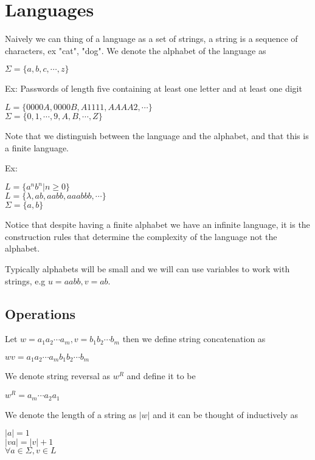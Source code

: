 \documentclass[11pt]{exam}
\begin{document}
\newpage 

\tableofcontents

\newpage
\section{Languages}

Naively we can thing of a language as a set of strings, a string is a sequence of characters, ex "cat", "dog".
We denote the alphabet of the language as
\begin{center}
$\Sigma = \{a,b,c, \cdots, z\}$
\end{center} 

Ex: Passwords of length five containing at least one letter and at least one digit

\begin{center}
$L = \{0000A, 0000B, A1111, AAAA2, \cdots \}$\\
$\Sigma = \{0,1, \cdots, 9, A , B , \cdots , Z \}$ 
\end{center} 

Note that we distinguish between the language and the alphabet, and that this is a finite language.

Ex: 
\begin{center}
$L = \{a^nb^n | n \geq 0 \}$\\
$L = \{ \lambda, ab, aabb, aaabbb, \cdots \}$\\
$\Sigma = \{a,b\}$\\ 
\end{center}

Notice that despite having a finite alphabet we have an infinite language, it is the construction rules that determine the complexity of the language not the alphabet.

Typically alphabets will be small and we will can use variables to work with strings, e.g  $u = aabb, v = ab$. 

\subsection{Operations}

Let $w = a_1a_2\cdots a_m, v=b_1b_2\cdots b_m$ then we define string concatenation as 
\begin{center}
$wv = a_1a_2\cdots a_mb_1b_2\cdots b_m$
\end{center}
We denote string reversal as $w^R$ and define it to be
\begin{center}
$w^R = a_m \cdots a_2a_1$
\end{center}
We denote the length of a string as $|w|$ and it can be thought of inductively as
\begin{center}
$|a| = 1$\\
$|va| = |v| + 1$\\
$\forall a \in \Sigma, v \in L$
\end{center}
\end{document}

